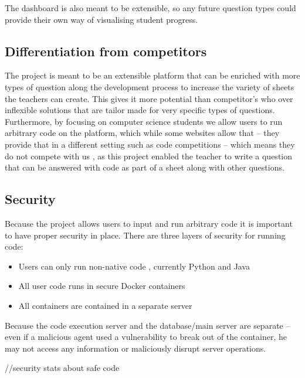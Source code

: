 The dashboard is also meant to be extensible, so any future question types could provide their own way of visualising student progress.

\subsection{Differentiation from competitors}
The project is meant to be an extensible platform that can be enriched with more types of question along the development process to increase the variety of sheets the teachers can create. This gives it more potential than competitor’s who over inflexible solutions that are tailor made for very specific types of questions.
Furthermore, by focusing on computer science students we allow users to run arbitrary code on the platform, which while some websites allow that – they provide that in a different setting such as code competitions – which means they do not compete with us , as this project enabled the teacher to write a question that can be answered with code as part of a sheet along with other questions.

\subsection{Security}
Because the project allows users to input and run arbitrary code it is important to have proper security in place. There are three layers of security for running code:
\begin{itemize}
\item Users can only run non-native code , currently Python and Java
\item 	All user code runs in secure Docker containers
\item	All containers are contained in a separate server
\end{itemize}
Because the code execution server and the database/main server are separate – even if a malicious agent used a vulnerability to break out of the container, he may not access any information or maliciously disrupt server operations.

//security stats about safe code

